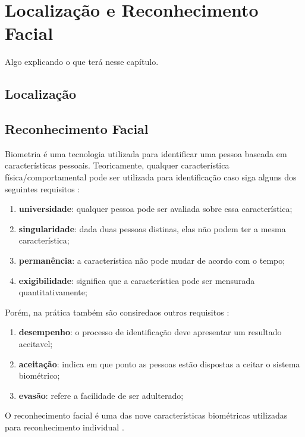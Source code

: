 \textual

\chapter{Localização e Reconhecimento Facial}

	Algo explicando o que terá nesse capítulo.


\section{Localização}

\section{Reconhecimento Facial}

Biometria é uma tecnologia utilizada para identificar uma pessoa baseada em características pessoais. Teoricamente, qualquer característica física/comportamental pode ser utilizada para identificação caso siga alguns dos seguintes requisitos \cite{milene}: 

	\begin{enumerate}
		\item \textbf{universidade}: qualquer pessoa pode ser avaliada sobre essa característica;
		\item \textbf{singularidade}: dada duas pessoas distinas, elas não podem ter a mesma característica;
		\item \textbf{permanência}: a característica não pode mudar de acordo com o tempo;
		\item \textbf{exigibilidade}: significa que a característica pode ser mensurada quantitativamente;
	\end{enumerate}

Porém, na prática também são consiredaos outros requisitos \cite{milene}:

	\begin{enumerate}
		\item \textbf{desempenho}: o processo de identificação deve apresentar um resultado aceitavel;
		\item \textbf{aceitação}: indica em que ponto as pessoas estão dispostas a ceitar o sistema biométrico;
		\item \textbf{evasão}: refere a facilidade de ser adulterado;
	\end{enumerate}

O reconhecimento facial é uma das nove características biométricas utilizadas para reconhecimento individual \cite{milene}.
	
